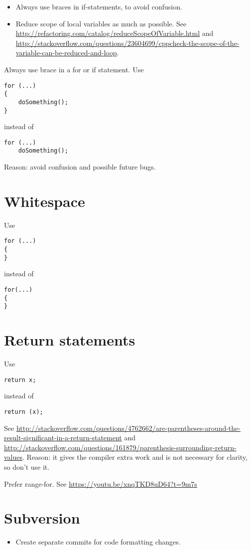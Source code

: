 \documentclass{article}
\begin{document}
\begin{itemize}
\item Always use braces in if-statements, to avoid confusion.
\item Reduce scope of local variables as much as possible.  See \url{http://refactoring.com/catalog/reduceScopeOfVariable.html} and \url{http://stackoverflow.com/questions/23604699/cppcheck-the-scope-of-the-variable-can-be-reduced-and-loop}.
\end{itemize}

Always use brace in a for or if statement.  Use
\begin{lstlisting}
for (...)
{
    doSomething();
}
\end{lstlisting}
instead of
\begin{lstlisting}
for (...)
    doSomething();
\end{lstlisting}
Reason: avoid confusion and possible future bugs.

\section{Whitespace}
Use
\begin{lstlisting}
for (...)
{
}
\end{lstlisting}
instead of
\begin{lstlisting}
for(...)
{
}
\end{lstlisting}


\section{Return statements}

Use
\begin{lstlisting}
return x;
\end{lstlisting}
instead of
\begin{lstlisting}
return (x);
\end{lstlisting}
See \url{http://stackoverflow.com/questions/4762662/are-parentheses-around-the-result-significant-in-a-return-statement} and \url{http://stackoverflow.com/questions/161879/parenthesis-surrounding-return-values}.
Reason: it gives the compiler extra work and is not necessary for clarity, so don't use it.

\begin{guideline}
Prefer range-for.
See \url{https://youtu.be/xnqTKD8uD64?t=9m7s}
\end{guideline}

\section{Subversion}

\begin{itemize}
	\item Create separate commits for code formatting changes.
\end{itemize}
\end{document}
